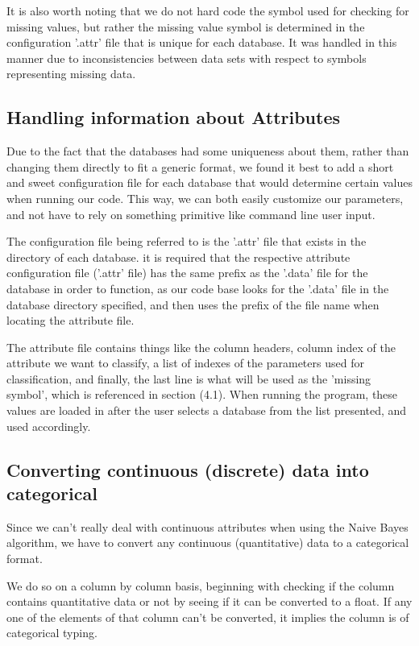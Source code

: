 \documentclass[twoside,11pt]{article}
\begin{document}
It is also worth noting that we do not hard code the symbol used for checking for missing values, but rather the missing value symbol is determined in the configuration '.attr' file that is unique for each database. It was handled in this manner due to inconsistencies between data sets with respect to symbols representing missing data.

\subsection{Handling information about Attributes}
Due to the fact that the databases had some uniqueness about them, rather than changing them directly to fit a generic format, we found it best to add a short and sweet configuration file for each database that would determine certain values when running our code. This way, we can both easily customize our parameters, and not have to rely on something primitive like command line user input. 

The configuration file being referred to is the '.attr' file that exists in the directory of each database. it is required that the respective attribute configuration file ('.attr' file) has the same prefix as the '.data' file for the database in order to function, as our code base looks for the '.data' file in the database directory specified, and then uses the prefix of the file name when locating the attribute file. 

The attribute file contains things like the column headers, column index of the attribute we want to classify, a list of indexes of the parameters used for classification, and finally, the last line is what will be used as the 'missing symbol', which is referenced in section (4.1). When running the program, these values are loaded in after the user selects a database from the list presented, and used accordingly.

\subsection{Converting continuous (discrete) data into categorical}

Since we can’t really deal with continuous attributes when using the Naive Bayes algorithm, we have to convert any continuous (quantitative) data to a categorical format. 

We do so on a column by column basis, beginning with checking if the column contains quantitative data or not by seeing if it can be converted to a float. If any one of the elements of that column can’t be converted, it implies the column is of categorical typing. 
\end{document}
